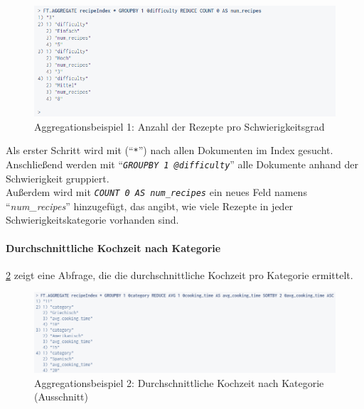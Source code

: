 \begin{figure}[!h]  %
    \centering      %
    \includegraphics[width=1\textwidth]{pictures/redis/redisearch_aggregation_example_2.png}
    \caption{Aggregationsbeispiel 1: Anzahl der Rezepte pro Schwierigkeitsgrad}      %
    \label{pic:redisearch-aggregation-example-2}    %
\end{figure}

Als erster Schritt wird mit (\enquote{\emph{\texttt{*}}}) nach allen Dokumenten im Index gesucht.\\
Anschließend werden mit \enquote{\emph{\texttt{GROUPBY 1 @difficulty}}} alle Dokumente anhand der Schwierigkeit gruppiert.\\ 
Außerdem wird mit \emph{\texttt{COUNT 0 AS num\_recipes}} ein neues Feld namens \enquote{\emph{num\_recipes}} hinzugefügt, das angibt, wie viele Rezepte in jeder Schwierigkeitskategorie vorhanden sind.



\paragraph{Durchschnittliche Kochzeit nach Kategorie}
\cref{pic:redisearch-aggregation-example-3} zeigt eine Abfrage, die die durchschnittliche Kochzeit pro Kategorie ermittelt.

\begin{figure}[!h]  %
    \centering      %
    \includegraphics[width=1\textwidth]{pictures/redis/redisearch_aggregation_example_3.png}
    \caption{Aggregationsbeispiel 2: Durchschnittliche Kochzeit nach Kategorie (Ausschnitt)}      %
    \label{pic:redisearch-aggregation-example-3}    %
\end{figure}

